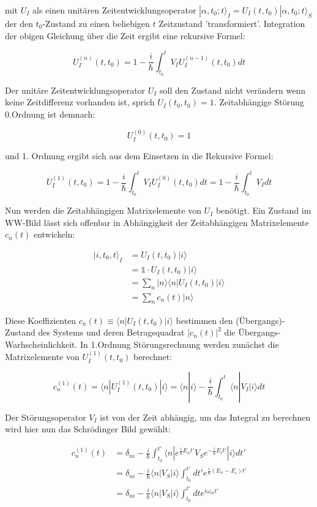 mit \(U_I\) als einen unitären Zeitentwicklungsoperator \(|\alpha,t_0;t\rangle_I = U_I(t,t_0) |\alpha,t_0;t\rangle_S \) der den \(t_0\)-Zustand zu einen beliebigen \(t\) Zeitzustand 'transformiert'. Integration der obigen Gleichung über die Zeit ergibt eine rekursive Formel:

\[U_I^{(n)}(t,t_0) = 1-\frac{i}{\hbar}\int_{t_0}^t V_IU_I^{(n-1)}(t,t_0)dt\]

Der unitäre Zeitentwicklungsoperator \(U_I\) soll den Zustand nicht verändern wenn keine Zeitdifferenz vorhanden ist, sprich \(U_I(t_0,t_0)=1\). Zeitabhängige Störung 0.Ordnung ist demnach:

\[U_I^{(0)}(t,t_0)=1\]


und 1. Ordnung ergibt sich aus dem Einsetzen in die Rekursive Formel:

\[U_I^{(1)}(t,t_0) = 1-\frac{i}{\hbar}\int_{t_0}^t V_IU_I^{(0)}(t,t_0)dt = 1-\frac{i}{\hbar}\int_{t_0}^t V_I dt\]

Nun werden die Zeitabhängigen Matrixelemente von \(U_I\) benötigt. Ein Zustand im WW-Bild lässt sich offenbar in Abhängigkeit der Zeitabhängigen Matrixelemente \(c_n(t)\) entwickeln:

\begin{align}
|i,t_0,t\rangle_I &= U_I(t,t_0)|i\rangle \\
&=\mathbb 1\cdot U_I(t,t_0)|i\rangle \\
&=\sum_n |n\rangle \langle n| U_I(t,t_0)|i\rangle \\
&= \sum_n c_n(t) |n\rangle
\end{align}


Diese Koeffizienten \(c_n(t)\equiv \langle n| U_I(t,t_0)|i\rangle \) bestimmen den (Übergangs)-Zustand des Systems und deren Betragsquadrat \(|c_n(t)|^2\) die Übergangs-Warhscheinlichkeit. In 1.Ordnung Störungsrechnung werden zunächst die Matrixelemente von \(U_I^{(1)}(t,t_0)\) berechnet:

\[ c_n^{(1)}(t) =  \langle n| U_I^{(1)}(t,t_0)|i\rangle = \langle n|i\rangle -  \frac{i}{\hbar}\int_{t_0}^t \langle n|V_I|i\rangle dt \]

Der Störungsoperator \(V_I\) ist von der Zeit abhängig, um das Integral zu berechnen wird hier nun das Schrödinger Bild gewählt:

\begin{align}
c_n^{(1)}(t) &= \delta_{ni} -  \frac{i}{\hbar}\int_{t_0}^{t'} \langle n|e^{\frac{i}{\hbar}E_nt'} V_S e^{-\frac{i}{\hbar}E_it'} |i\rangle dt' \\
&= \delta_{ni} -  \frac{i}{\hbar}\langle n|V_S  |i\rangle \int_{t_0}^{t'} dt' e^{\frac{i}{\hbar}(E_n-E_i)t'} \\
&= \delta_{ni} -  \frac{i}{\hbar}\langle n|V_S  |i\rangle \int_{t_0}^{t'} dt e^{i\omega_{ni}t'}
\end{align}

